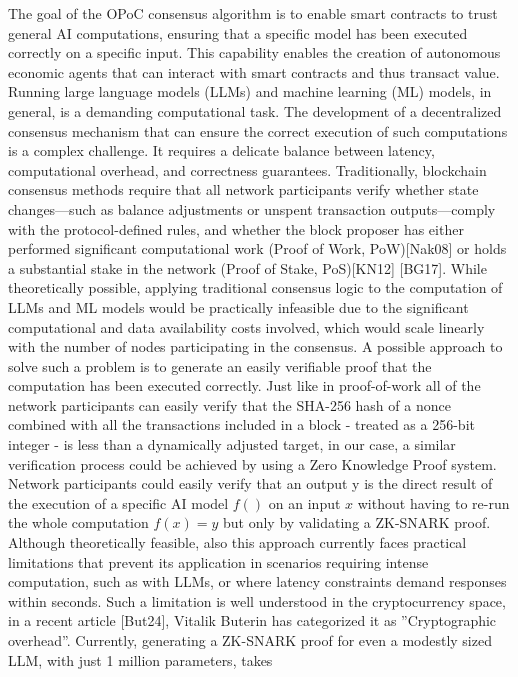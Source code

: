 \documentclass{article}
\begin{document}
The goal of the OPoC consensus algorithm is to enable smart contracts to trust general AI computations, ensuring that a specific model has been executed correctly on a specific input. This capability enables the creation of autonomous economic agents that can interact with smart contracts and thus transact value.
Running large language models (LLMs) and machine learning (ML) models, in general, is a demanding
computational task. The development of a decentralized consensus mechanism that can ensure the
correct execution of such computations is a complex challenge. It requires a delicate balance between
latency, computational overhead, and correctness guarantees.
Traditionally, blockchain consensus methods require that all network participants verify whether
state changes—such as balance adjustments or unspent transaction outputs—comply with the protocol-defined rules, and whether the block proposer has either performed significant computational work
(Proof of Work, PoW)[Nak08] or holds a substantial stake in the network (Proof of Stake, PoS)[KN12]
[BG17]. While theoretically possible, applying traditional consensus logic to the computation of LLMs
and ML models would be practically infeasible due to the significant computational and data availability costs involved, which would scale linearly with the number of nodes participating in the consensus.
A possible approach to solve such a problem is to generate an easily verifiable proof that the
computation has been executed correctly. Just like in proof-of-work all of the network participants can
easily verify that the SHA-256 hash of a nonce combined with all the transactions included in a block -
treated as a 256-bit integer - is less than a dynamically adjusted target, in our case, a similar verification
process could be achieved by using a Zero Knowledge Proof system. Network participants could easily
verify that an output y is the direct result of the execution of a specific AI model \( f() \) on an input \( x \) without having to re-run the whole computation \( f(x) = y \) but only by validating a ZK-SNARK proof.
Although theoretically feasible, also this approach currently faces practical limitations that prevent its
application in scenarios requiring intense computation, such as with LLMs, or where latency constraints
demand responses within seconds. Such a limitation is well understood in the cryptocurrency space,
in a recent article [But24], Vitalik Buterin has categorized it as ”Cryptographic overhead”. Currently,
generating a ZK-SNARK proof for even a modestly sized LLM, with just 1 million parameters, takes
\end{document}
